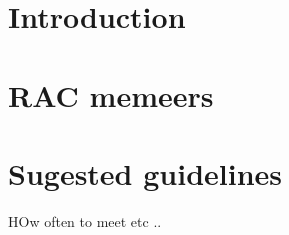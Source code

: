 \section{Introduction}
\section{RAC memeers}\label{sec:members}
\section{Sugested guidelines}\label{sec:guidelines}
HOw often to meet etc ..
